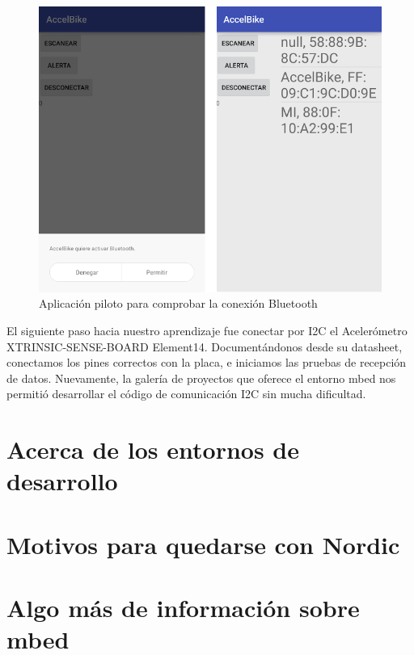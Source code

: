 \begin{figure}[h]%
	\centering 	
    \includegraphics[width=\textwidth]{figures/app_piloto2.PNG} %
   	\caption[Aplicación piloto para comprobar la conexión Bluetooth]{Aplicación piloto para comprobar la conexión Bluetooth}
   	\label{figuraAPPPrueba}

\end{figure}

El siguiente paso hacia nuestro aprendizaje fue conectar por I2C el Acelerómetro XTRINSIC-SENSE-BOARD Element14. Documentándonos desde su datasheet, conectamos los pines correctos con la placa, e iniciamos las pruebas de recepción de datos.
Nuevamente, la galería de proyectos que oferece el entorno mbed nos permitió desarrollar el código de comunicación I2C sin mucha dificultad.


\section{Acerca de los entornos de desarrollo}
\label{makereference4.2}

\section{Motivos para quedarse con Nordic}
\label{makereference4.3}

\section{Algo más de información sobre mbed}
\label{makereference4.4}

